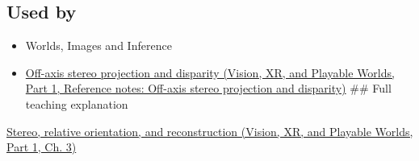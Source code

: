 \subsection{Used by}\label{appendix-c4e98b6e4001-used-by}

\hypertarget{appendix-c4e98b6e4001-used-by}{}

\begin{itemize}
\item
  {Worlds, Images and Inference}
\item
  \href{../07-Vision-XR-and-Playable-Worlds-P01/main.pdf\#appendix-0976e86e5b9f}{Off-axis stereo projection and disparity (Vision, XR, and Playable Worlds, Part 1, Reference notes: Off-axis stereo projection and disparity)} \#\# Full teaching explanation
\end{itemize}

\href{../07-Vision-XR-and-Playable-Worlds-P01/main.pdf\#04-visual-computing-ii-ch032-stereo-relative-orientation-and-reconstruction}{Stereo, relative orientation, and reconstruction (Vision, XR, and Playable Worlds, Part 1, Ch. 3)}
